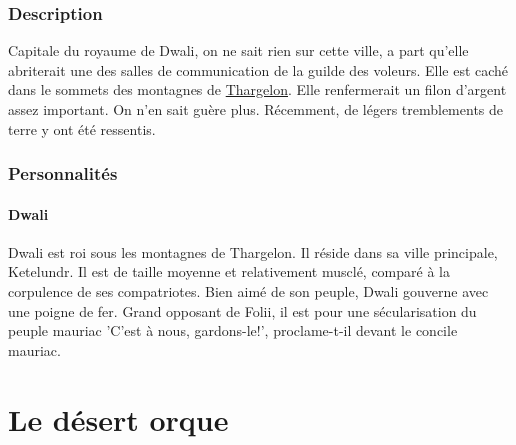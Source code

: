 \subsubsection{Description}
\hypertarget {ketelundr}{}Capitale du royaume de Dwali, on ne sait rien sur cette ville,
a part qu'elle abriterait une des salles de communication de la guilde des voleurs.
Elle est caché dans le sommets des montagnes de \hyperlink {thargelon}{Thargelon}.
Elle renfermerait un filon d'argent assez important. On n'en sait guère plus.
Récemment, de légers tremblements de terre y ont été ressentis.
\subsubsection{Personnalités}
\paragraph{Dwali}
\hypertarget{dwali}{}Dwali est roi sous les montagnes de Thargelon. Il réside dans sa ville principale, Ketelundr.
Il est de taille moyenne et relativement musclé, comparé à la corpulence de ses compatriotes.
Bien aimé de son peuple, Dwali gouverne avec une poigne de fer. 
Grand opposant de Folii, il est pour une sécularisation du peuple mauriac 'C'est à nous, gardons-le!', proclame-t-il devant le concile mauriac.
\section{Le désert orque}
